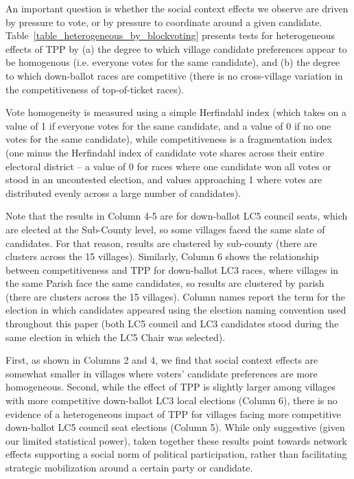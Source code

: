 \documentclass[12pt]{article}
\begin{document}
\begin{appendix}
An important question is whether the social context effects we observe are driven by pressure to vote, or by pressure to coordinate around a given candidate. Table~\ref{table_heterogeneous_by_blockvoting} presents tests for heterogeneous effects of TPP by (a) the degree to which village candidate preferences appear to be homogenous (i.e. everyone votes for the same candidate), and (b) the degree to which down-ballot races are competitive (there is no cross-village variation in the competitiveness of top-of-ticket races).

Vote homogeneity is measured using a simple Herfindahl index (which takes on a value of 1 if everyone votes for the same candidate, and a value of 0 if no one votes for the same candidate), while competitiveness is a fragmentation index (one minus the Herfindahl index of candidate vote shares across their entire electoral district -- a value of 0 for races where one candidate won all votes or stood in an uncontested election, and values approaching 1 where votes are distributed evenly across a large number of candidates).

Note that the results in Column 4-5 are for down-ballot LC5 council seats, which are elected at the Sub-County level, so some villages faced the same slate of candidates. For that reason, results are clustered by sub-county (there are  clusters across the 15 villages). Similarly, Column 6 shows the relationship between competitiveness and TPP for down-ballot LC3 races, where villages in the same Parish face the same candidates, so results are clustered by parish (there are  clusters across the 15 villages). Column names report the term for the election in which candidates appeared using the election naming convention used throughout this paper (both LC5 council and LC3 candidates stood during the same election in which the LC5 Chair was selected).

First, as shown in Columns 2 and 4, we find that social context effects are somewhat smaller in villages where voters' candidate preferences are more homogeneous. Second, while the effect of TPP is slightly larger among villages with more competitive down-ballot LC3 local elections (Column 6), there is no evidence of a heterogeneous impact of TPP for villages facing more competitive down-ballot LC5 council seat elections (Column 5). While only suggestive (given our limited statistical power), taken together these results point towards network effects supporting a social norm of political participation, rather than facilitating strategic mobilization around a certain party or candidate.


\end{appendix}
\end{document}
